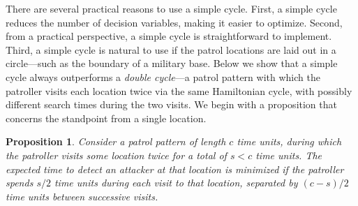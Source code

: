 \documentclass[11pt,a4paper]{article}
\newtheorem{proposition}[theorem]{Proposition}
\begin{document}
There are several practical reasons to use a simple cycle.
First, a simple cycle reduces the number of decision variables, making it easier to optimize.
Second, from a practical perspective, a simple cycle is straightforward to implement.
Third, a simple cycle is natural to use if the patrol locations are laid out in a circle---such as the boundary of a military base.
Below we show that a simple cycle always outperforms a \textit{double cycle}---a patrol pattern with which the patroller visits each location twice via the same Hamiltonian cycle, with possibly different search times during the two visits.
We begin with a proposition that concerns the standpoint from a single location.

\begin{proposition} \label{prop: 2 visits propersition}
    Consider a patrol pattern of length $c$ time units, during which the patroller visits some location twice for a total of $s < c$ time units.
    The expected time to detect an attacker at that location is minimized if the patroller spends $s/2$ time units during each visit to that location, separated by $(c-s)/2$ time units between successive visits.
    \end{proposition}
\end{document}
